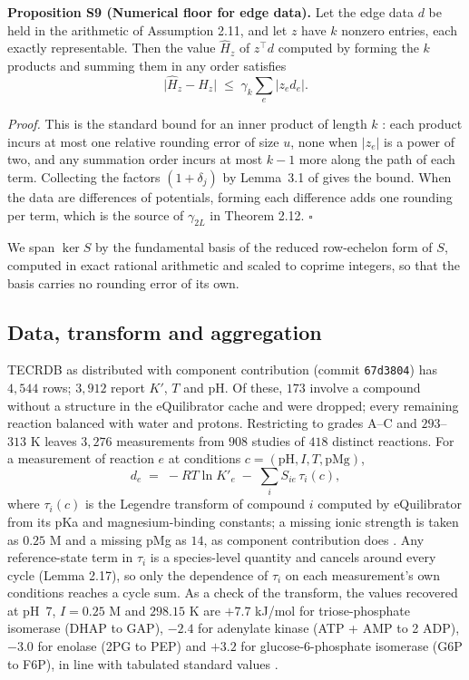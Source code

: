\documentclass[11pt,a4paper]{article}
\theoremstyle{definition}
\theoremstyle{remark}
\newcommand{\abs}[1]{\lvert#1\rvert}
\newcommand{\hol}{H}
\newcommand{\mach}{u}
\begin{document}
\par\noindent\textbf{Proposition S9 (Numerical floor for edge data).}\label{prop:edge-floor} 
Let the edge data $d$ be held in the arithmetic of Assumption 2.11, and
let $z$ have $k$ nonzero entries, each exactly representable. Then the
value $\widehat{\hol}_z$ of $z^{\top}d$ computed by forming the $k$
products and summing them in any order satisfies
\[
  \bigl\lvert\widehat{\hol}_z-\hol_z\bigr\rvert
  \;\le\;\gamma_k\sum_{e}\abs{z_e d_e}.
\]
\par

\noindent\emph{Proof.} This is the standard bound for an inner product
of length $k$ \citep[Section~3.1]{higham2002}: each product incurs at
most one relative rounding error of size $\mach$, none when $\abs{z_e}$
is a power of two, and any summation order incurs at most $k-1$ more
along the path of each term. Collecting the factors $(1+\delta_j)$ by
Lemma~3.1 of \citet{higham2002} gives the bound. When the data are
differences of potentials, forming each difference adds one rounding
per term, which is the source of $\gamma_{2L}$ in
Theorem 2.12. \hfill$\square$

We span $\ker S$ by the fundamental basis of the reduced row-echelon
form of $S$, computed in exact rational arithmetic and scaled to coprime
integers, so that the basis carries no rounding error of its own.

\subsection*{Data, transform and aggregation}

TECRDB as distributed with component contribution (commit
\texttt{67d3804}) has $4{,}544$ rows; $3{,}912$ report $K'$, $T$ and
pH. Of these, $173$ involve a compound without a structure in the
eQuilibrator cache and were dropped; every remaining reaction balanced
with water and protons. Restricting to grades A--C and $293$--$313$ K
leaves $3{,}276$ measurements from $908$ studies of $418$ distinct
reactions. For a measurement of reaction $e$ at conditions
$c=(\mathrm{pH},I,T,\mathrm{pMg})$,
\[
  d_e \;=\; -RT\ln K'_e \;-\; \sum_i S_{ie}\,\tau_i(c),
\]
where $\tau_i(c)$ is the Legendre transform of compound $i$ computed by
eQuilibrator \citep{beber2022} from its pKa and magnesium-binding
constants; a missing ionic strength is taken as $0.25$ M and a missing
pMg as $14$, as component contribution does \citep{noor2013}. Any
reference-state term in $\tau_i$ is a species-level quantity and
cancels around every cycle (Lemma 2.17), so only the
dependence of $\tau_i$ on each measurement's own conditions reaches a
cycle sum. As a check of the transform, the values recovered at pH~$7$,
$I=0.25$ M and $298.15$ K are $+7.7$ kJ/mol for triose-phosphate
isomerase (DHAP to GAP), $-2.4$ for adenylate kinase (ATP + AMP to 2
ADP), $-3.0$ for enolase (2PG to PEP) and $+3.2$ for glucose-6-phosphate
isomerase (G6P to F6P), in line with tabulated standard values
\citep{alberty1998}.
\end{document}
